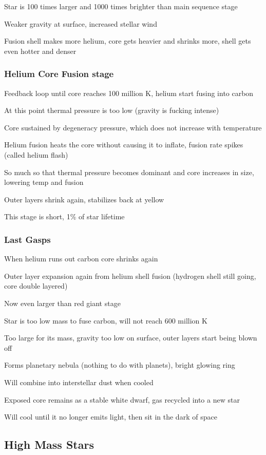 Star is 100 times larger and 1000 times brighter than main sequence stage

Weaker gravity at surface, increased stellar wind

Fusion shell makes more helium, core gets heavier and shrinks more, shell gets even hotter and denser

\subsubsection{Helium Core Fusion stage}
Feedback loop until core reaches 100 million K, helium start fusing into carbon

At this point thermal pressure is too low (gravity is fucking intense)

Core sustained by degeneracy pressure, which does not increase with temperature

Helium fusion heats the core without causing it to inflate, fusion rate spikes (called helium flash)

So much so that thermal pressure becomes dominant and core increases in size, lowering temp and fusion

Outer layers shrink again, stabilizes back at yellow

This stage is short, 1\% of star lifetime

\subsubsection{Last Gasps}
When helium runs out carbon core shrinks again

Outer layer expansion again from helium shell fusion (hydrogen shell still going, core double layered)

Now even larger than red giant stage

Star is too low mass to fuse carbon, will not reach 600 million K

Too large for its mass, gravity too low on surface, outer layers start being blown off

Forms planetary nebula (nothing to do with planets), bright glowing ring

Will combine into interstellar dust when cooled

Exposed core remains as a stable white dwarf, gas recycled into a new star

Will cool until it no longer emits light, then sit in the dark of space

\subsection{High Mass Stars}
